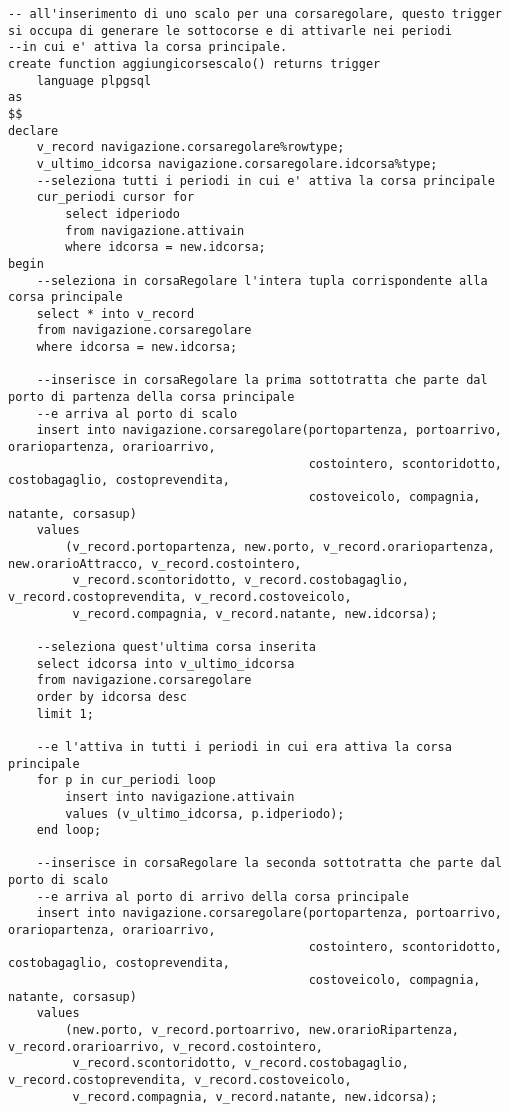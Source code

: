 \begin{lstlisting}[style = sqlstyle]
-- all'inserimento di uno scalo per una corsaregolare, questo trigger si occupa di generare le sottocorse e di attivarle nei periodi
--in cui e' attiva la corsa principale.
create function aggiungicorsescalo() returns trigger
    language plpgsql
as
$$
declare
    v_record navigazione.corsaregolare%rowtype;
    v_ultimo_idcorsa navigazione.corsaregolare.idcorsa%type;
    --seleziona tutti i periodi in cui e' attiva la corsa principale
    cur_periodi cursor for
        select idperiodo
        from navigazione.attivain
        where idcorsa = new.idcorsa;
begin
    --seleziona in corsaRegolare l'intera tupla corrispondente alla corsa principale
    select * into v_record
    from navigazione.corsaregolare
    where idcorsa = new.idcorsa;

    --inserisce in corsaRegolare la prima sottotratta che parte dal porto di partenza della corsa principale
    --e arriva al porto di scalo
    insert into navigazione.corsaregolare(portopartenza, portoarrivo, orariopartenza, orarioarrivo,
                                          costointero, scontoridotto, costobagaglio, costoprevendita,
                                          costoveicolo, compagnia, natante, corsasup)
    values
        (v_record.portopartenza, new.porto, v_record.orariopartenza, new.orarioAttracco, v_record.costointero,
         v_record.scontoridotto, v_record.costobagaglio, v_record.costoprevendita, v_record.costoveicolo,
         v_record.compagnia, v_record.natante, new.idcorsa);

    --seleziona quest'ultima corsa inserita
    select idcorsa into v_ultimo_idcorsa
    from navigazione.corsaregolare
    order by idcorsa desc
    limit 1;

    --e l'attiva in tutti i periodi in cui era attiva la corsa principale
    for p in cur_periodi loop
        insert into navigazione.attivain
        values (v_ultimo_idcorsa, p.idperiodo);
    end loop;

    --inserisce in corsaRegolare la seconda sottotratta che parte dal porto di scalo 
    --e arriva al porto di arrivo della corsa principale
    insert into navigazione.corsaregolare(portopartenza, portoarrivo, orariopartenza, orarioarrivo,
                                          costointero, scontoridotto, costobagaglio, costoprevendita,
                                          costoveicolo, compagnia, natante, corsasup)
    values
        (new.porto, v_record.portoarrivo, new.orarioRipartenza, v_record.orarioarrivo, v_record.costointero,
         v_record.scontoridotto, v_record.costobagaglio, v_record.costoprevendita, v_record.costoveicolo,
         v_record.compagnia, v_record.natante, new.idcorsa);


\end{lstlisting}
